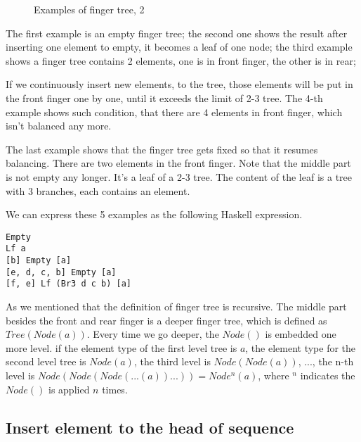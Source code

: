 \documentclass[UTF8]{article}
\begin{document}
\begin{figure}[htbp]
  \centering
  \hspace{0.2\textwidth}
  \caption{Examples of finger tree, 2} \label{fig:ftr-example-2}
\end{figure}

The first example is an empty finger tree; the second one shows the result after
inserting one element to empty, it becomes a leaf of one node; the third example
shows a finger tree contains 2 elements, one is in front finger, the other is
in rear;

If we continuously insert new elements, to the tree, those elements will be
put in the front finger one by one, until it exceeds the limit of 2-3 tree.
The 4-th example shows such condition, that there are 4 elements in front
finger, which isn't balanced any more.

The last example shows that the finger tree gets fixed so that it resumes
balancing. There are two elements in the front finger. Note that the middle
part is not empty any longer. It's a leaf of a 2-3 tree. The content of the
leaf is a tree with 3 branches, each contains an element.

We can express these 5 examples as the following Haskell expression.

\lstset{language=Haskell}
\begin{lstlisting}
Empty
Lf a
[b] Empty [a]
[e, d, c, b] Empty [a]
[f, e] Lf (Br3 d c b) [a]
\end{lstlisting}

As we mentioned that the definition of finger tree is recursive.
The middle part besides the front and rear finger is a deeper finger tree,
which is defined as $Tree(Node(a))$. Every time we go deeper, the
$Node()$ is embedded one more level. if the element type of the first level tree
is $a$, the element type for the second level tree is $Node(a)$,
the third level is $Node(Node(a))$, ..., the n-th level is
$Node(Node(Node(...(a))...)) = Node^n(a)$, where $^n$ indicates the $Node()$
is applied $n$ times.

\subsection{Insert element to the head of sequence}
\end{document}
